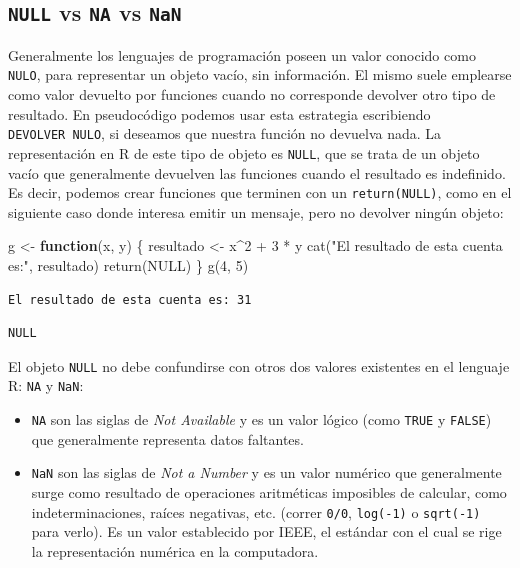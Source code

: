 \documentclass[
]{book}
\newenvironment{Shaded}{\begin{snugshade}}{\end{snugshade}}
\newcommand{\ConstantTok}[1]{\textcolor[rgb]{0.00,0.00,0.00}{#1}}
\newcommand{\ControlFlowTok}[1]{\textcolor[rgb]{0.13,0.29,0.53}{\textbf{#1}}}
\newcommand{\DecValTok}[1]{\textcolor[rgb]{0.00,0.00,0.81}{#1}}
\newcommand{\FunctionTok}[1]{\textcolor[rgb]{0.00,0.00,0.00}{#1}}
\newcommand{\NormalTok}[1]{#1}
\newcommand{\OtherTok}[1]{\textcolor[rgb]{0.56,0.35,0.01}{#1}}
\newcommand{\SpecialCharTok}[1]{\textcolor[rgb]{0.00,0.00,0.00}{#1}}
\newcommand{\StringTok}[1]{\textcolor[rgb]{0.31,0.60,0.02}{#1}}
\providecommand{\tightlist}{%
  \setlength{\itemsep}{0pt}\setlength{\parskip}{0pt}}
\begin{document}
\hypertarget{null-vs-na-vs-nan}{%
\subsection{\texorpdfstring{\texttt{NULL} vs \texttt{NA} vs \texttt{NaN}}{NULL vs NA vs NaN}}\label{null-vs-na-vs-nan}}

Generalmente los lenguajes de programación poseen un valor conocido como \texttt{NULO}, para representar un objeto vacío, sin información. El mismo suele emplearse como valor devuelto por funciones cuando no corresponde devolver otro tipo de resultado. En pseudocódigo podemos usar esta estrategia escribiendo \texttt{DEVOLVER\ NULO}, si deseamos que nuestra función no devuelva nada. La representación en R de este tipo de objeto es \texttt{NULL}, que se trata de un objeto vacío que generalmente devuelven las funciones cuando el resultado es indefinido. Es decir, podemos crear funciones que terminen con un \texttt{return(NULL)}, como en el siguiente caso donde interesa emitir un mensaje, pero no devolver ningún objeto:

\begin{Shaded}
\begin{Highlighting}[]
\NormalTok{g }\OtherTok{\textless{}{-}} \ControlFlowTok{function}\NormalTok{(x, y) \{}
\NormalTok{    resultado }\OtherTok{\textless{}{-}}\NormalTok{ x}\SpecialCharTok{\^{}}\DecValTok{2} \SpecialCharTok{+} \DecValTok{3} \SpecialCharTok{*}\NormalTok{ y}
    \FunctionTok{cat}\NormalTok{(}\StringTok{"El resultado de esta cuenta es:"}\NormalTok{, resultado)}
    \FunctionTok{return}\NormalTok{(}\ConstantTok{NULL}\NormalTok{)}
\NormalTok{\}}
\FunctionTok{g}\NormalTok{(}\DecValTok{4}\NormalTok{, }\DecValTok{5}\NormalTok{)}
\end{Highlighting}
\end{Shaded}

\begin{verbatim}
El resultado de esta cuenta es: 31
\end{verbatim}

\begin{verbatim}
NULL
\end{verbatim}

El objeto \texttt{NULL} no debe confundirse con otros dos valores existentes en el lenguaje R: \texttt{NA} y \texttt{NaN}:

\begin{itemize}
\tightlist
\item
  \texttt{NA} son las siglas de \emph{Not Available} y es un valor lógico (como \texttt{TRUE} y \texttt{FALSE}) que generalmente representa datos faltantes.
\item
  \texttt{NaN} son las siglas de \emph{Not a Number} y es un valor numérico que generalmente surge como resultado de operaciones aritméticas imposibles de calcular, como indeterminaciones, raíces negativas, etc. (correr \texttt{0/0}, \texttt{log(-1)} o \texttt{sqrt(-1)} para verlo). Es un valor establecido por IEEE, el estándar con el cual se rige la representación numérica en la computadora.
\end{itemize}
\end{document}
